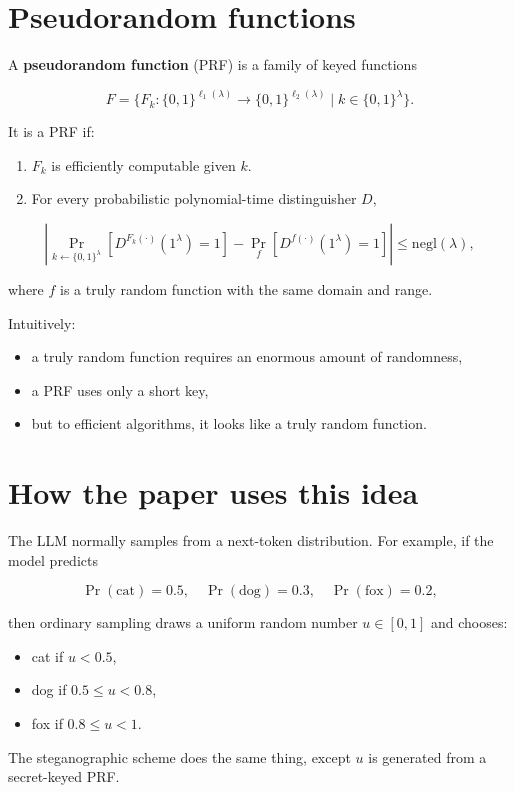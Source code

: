 \documentclass[11pt]{article}
\begin{document}
\section{Pseudorandom functions}

\begin{definition}
\label{def:prf}
A \textbf{pseudorandom function} (PRF) is a family of keyed functions

\[
F=\{F_k:\{0,1\}^{\ell_1(\lambda)}
\to
\{0,1\}^{\ell_2(\lambda)}
\mid k\in\{0,1\}^{\lambda}\}.
\]

It is a PRF if:

\begin{enumerate}[label=\arabic*.]
    \item $F_k$ is efficiently computable given $k$.
    
    \item For every probabilistic polynomial-time distinguisher $D$,
\end{enumerate}

\[
\left|
\Pr_{k\leftarrow\{0,1\}^{\lambda}}
\left[D^{F_k(\cdot)}(1^\lambda)=1\right]
-
\Pr_f
\left[D^{f(\cdot)}(1^\lambda)=1\right]
\right|
\le
\mathrm{negl}(\lambda),
\]

where $f$ is a truly random function with the same domain and range.
\end{definition}

\begin{remark}
\label{rem:prf-intuition}
Intuitively:

\begin{itemize}
    \item a truly random function requires an enormous amount of randomness,
    \item a PRF uses only a short key,
    \item but to efficient algorithms, it looks like a truly random function.
\end{itemize}
\end{remark}

\section{How the paper uses this idea}

\begin{example}
\label{ex:prf-sampling}
The LLM normally samples from a next-token distribution. For example, if the model predicts

\[
\Pr(\text{cat})=0.5,\quad
\Pr(\text{dog})=0.3,\quad
\Pr(\text{fox})=0.2,
\]

then ordinary sampling draws a uniform random number $u\in[0,1]$ and chooses:

\begin{itemize}
    \item cat if $u<0.5$,
    \item dog if $0.5\le u<0.8$,
    \item fox if $0.8\le u<1$.
\end{itemize}

The steganographic scheme does the same thing, except $u$ is generated from a secret-keyed PRF.
\end{example}
\end{document}
